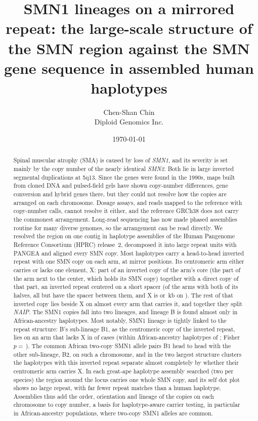 \documentclass[10pt]{article}
\title{SMN1 lineages on a mirrored repeat: the large-scale structure of the SMN region against the SMN gene sequence in \nHapsRes{} assembled human haplotypes}
\author{Chen-Shan Chin\\ \small Diploid Genomics Inc.}
\date{\today}
\begin{document}
\maketitle

\begin{abstract}
\noindent Spinal muscular atrophy (SMA) is caused by loss of \emph{SMN1}, and its severity is set mainly by the copy
number of the nearly identical \emph{SMN2}. Both lie in large inverted segmental duplications at 5q13. Since the genes were found in the 1990s, maps built from
cloned DNA and pulsed-field gels have shown copy-number differences, gene conversion and hybrid genes there, but they
could not resolve how the copies are arranged on each chromosome. Dosage assays, and reads mapped to the reference with
copy-number calls, cannot resolve it either, and the reference GRCh38 does not carry the commonest
arrangement. Long-read sequencing has now made phased assemblies routine for many diverse genomes, so the arrangement
can be read directly. We resolved the region on one contig in \nHapsRes{} haplotype
assemblies of the Human Pangenome Reference Consortium (HPRC) release~2, decomposed it into large repeat units with PANGEA and
aligned every SMN copy. Most haplotypes carry a head-to-head inverted repeat with one SMN copy on each arm, at mirror
positions. Its centromeric arm either carries or lacks one element, X: part of an inverted copy of the arm's core (the part of the arm next to the center, which holds its SMN copy) together with a direct copy of that part, an inverted repeat centered on a short spacer (of the \elCOne{} arms with both of its halves, all but \xcNoS{} have the spacer between them, and X is \xFormShortKb{} or \xFormLongKb{}\,kb on \xFormTwoN{}). The rest of that inverted copy lies beside X on almost every arm that carries it, and together they split \emph{NAIP}. The SMN1 copies fall into two lineages, and lineage B is found
almost only in African-ancestry haplotypes. Most notably, SMN1 lineage is tightly linked to the repeat structure:
B's sub-lineage B1, as the centromeric copy of the inverted repeat, lies on an arm that lacks X in \elBoneCZero{} of \elBoneCen{} cases (within African-ancestry haplotypes \elAfrBoneCZero{} of \elAfrBoneCen; Fisher $p=$\,\elAfrBoneP). The common African two-copy SMN1 allele pairs B1 head to
head with the other sub-lineage, B2, on such a chromosome, and in the two largest structure clusters the haplotypes with this inverted repeat separate almost completely by whether their centromeric arm carries X. In each great-ape haplotype assembly searched (two per species) the region around the locus carries one whole SMN copy, and its self dot plot shows no large repeat, with far fewer repeat matches than a human haplotype. Assemblies thus add the order,
orientation and lineage of the copies on each chromosome to copy number, a basis for haplotype-aware carrier testing,
in particular in African-ancestry populations, where two-copy SMN1 alleles are common.
\end{abstract}
\end{document}

